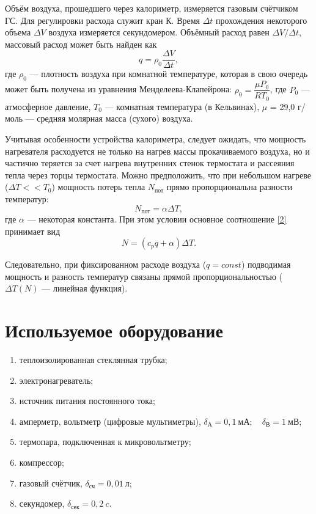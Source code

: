 \documentclass[a4paper, 12pt]{article}
\begin{document}
Объём воздуха, прошедшего через калориметр, измеряется газовым счётчиком ГС. Для регулировки расхода служит кран К. Время $\Delta t$ прохождения некоторого объема $\Delta V$ воздуха измеряется секундомером. Объёмный расход равен $\Delta V / \Delta t$, массовый расход может быть найден как
\begin{equation}\label{5}
q = \rho_0 \dfrac{\Delta V}{\Delta t},
\end{equation}
где $\rho_0$ --- плотность воздуха при комнатной температуре, которая в свою очередь может быть получена из уравнения Менделеева-Клапейрона: $\rho_0 = \dfrac{\mu P_0}{RT_0}$, где $P_0$ --- атмосферное давление, $T_0$ --- комнатная температура (в Кельвинах), $\mu$ = 29,0 г/моль --- средняя молярная масса (сухого) воздуха.

Учитывая особенности устройства калориметра, следует ожидать, что мощность нагревателя расходуется не только на нагрев массы прокачиваемого воздуха, но и частично теряется за счет нагрева внутренних стенок термостата и рассеяния тепла через торцы термостата. Можно предположить, что при небольшом нагреве ($\Delta T << T_0$) мощность потерь тепла $N_{\text{пот}}$ прямо пропорциональна разности температур:
\begin{equation}\label{6}
N_{\text{пот}} = \alpha \Delta T,
\end{equation}
где $\alpha$ --- некоторая константа. При этом условии основное соотношение \eqref{2} принимает вид
\begin{equation}\label{7}
N = (c_p q + \alpha) \Delta T.
\end{equation}

Следовательно, при фиксированном расходе воздуха ($q = const$) подводимая мощность и разность температур связаны прямой пропорциональностью ($\Delta T (N)$ --- линейная функция).

\section{Используемое оборудование}

\begin{enumerate}
    \item теплоизолированная стеклянная трубка;
    \item электронагреватель;
    \item источник питания постоянного тока;
    \item амперметр, вольтметр (цифровые мультиметры), $\delta_{А} = 0,1~мА;\quad \delta_{В} = 1~мВ$;
    \item термопара, подключенная к микровольтметру;
    \item компрессор;
    \item газовый счётчик, $\delta_{сч} = 0,01~л$;
    \item секундомер, $\delta_{сек} = 0,2~c$.
\end{enumerate}
\end{document}
